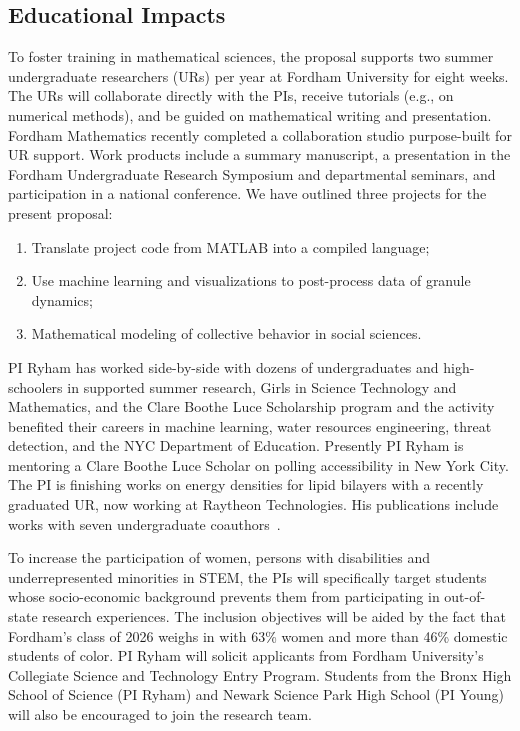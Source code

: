 \subsection{Educational Impacts}
\label{subsec:Educational_plans}
To foster training in mathematical sciences, the proposal supports two
summer undergraduate researchers (URs) per year at Fordham University for
eight weeks. The URs will collaborate directly with the PIs,
receive tutorials (e.g., on numerical methods), and be guided on
mathematical writing and presentation. Fordham Mathematics recently
completed a collaboration studio purpose-built for UR support. Work
products include a summary manuscript, a presentation in the Fordham
Undergraduate Research Symposium and departmental seminars, and
participation in a national conference. We have outlined three projects
for the present proposal:
\begin{enumerate}[noitemsep,topsep=0pt]
  \item Translate project code from MATLAB into a compiled language;
  \item Use machine learning and visualizations to post-process data of
    granule dynamics;
  \item Mathematical modeling of collective behavior in social sciences.
\end{enumerate}
PI Ryham has worked side-by-side with dozens of undergraduates and
high-schoolers in supported summer research, Girls in Science Technology
and Mathematics, and the Clare Boothe Luce Scholarship program and the
activity benefited their careers in machine learning, water resources
engineering, threat detection, and the NYC Department of Education.
Presently PI Ryham is mentoring a Clare Boothe Luce Scholar on polling
accessibility in New York City. The PI is finishing works on energy
densities for lipid bilayers with a recently graduated UR, now working
at Raytheon Technologies. His publications include works with seven
undergraduate coauthors~\cite{Figueroa2012CuttingCI, RYHAM20112929,
RyWaCo13, RyKlYaCo16}.

To increase the participation of women, persons with disabilities and
underrepresented minorities in STEM, the PIs will specifically target
students whose socio-economic background prevents them from
participating in out-of-state research experiences. The inclusion
objectives will be aided by the fact that Fordham's class of 2026 weighs
in with 63\% women and more than 46\% domestic students of color. PI
Ryham will solicit applicants from Fordham University's Collegiate
Science and Technology Entry Program. Students from the Bronx High
School of Science (PI Ryham) and Newark Science Park High School (PI
Young) will also be encouraged to join the research team. 

